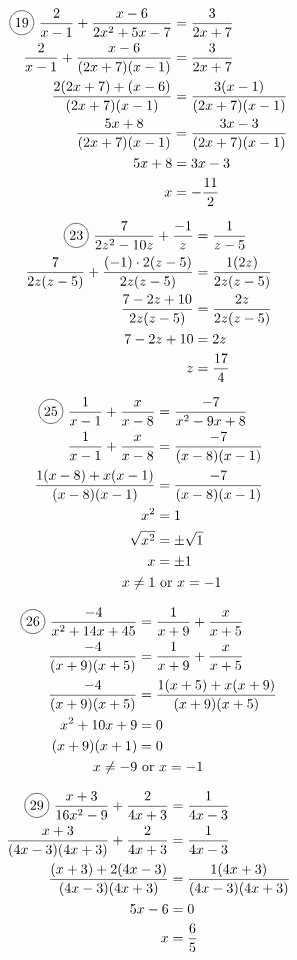 \begin{multicols}{2}
\begin{align*}
  \circled{19}\ \frac{2}{x-1}+\frac{x-6}{2x^{2}+5x-7}&=\frac{3}{2x+7}\\
  \frac{2}{x-1}+\frac{x-6}{(2x+7)(x-1)}&=\frac{3}{2x+7}\\
  \frac{2(2x+7)+(x-6)}{(2x+7)(x-1)}&=\frac{3(x-1)}{(2x+7)(x-1)}\\
  \frac{5x+8}{(2x+7)(x-1)}&=\frac{3x-3}{(2x+7)(x-1)}\\
  5x+8&=3x-3\\
  x&=-\frac{11}{2}
\end{align*}

\begin{align*}
  \circled{23}\ \frac{7}{2z^{2}-10z}+\frac{-1}{z}&=\frac{1}{z-5}\\
  \frac{7}{2z(z-5)}+\frac{(-1)\cdot 2(z-5)}{2z(z-5)}&=\frac{1(2z)}{2z(z-5)}\\
  \frac{7-2z+10}{2z(z-5)}&=\frac{2z}{2z(z-5)}\\
  7-2z+10&=2z\\
  z&=\frac{17}{4}
\end{align*}

\begin{align*}
  \circled{25}\ \frac{1}{x-1}+\frac{x}{x-8}&=\frac{-7}{x^{2}-9x+8}\\
  \frac{1}{x-1}+\frac{x}{x-8}&=\frac{-7}{(x-8)(x-1)}\\
  \frac{1(x-8)+x(x-1)}{(x-8)(x-1)}&=\frac{-7}{(x-8)(x-1)}\\
  x^{2}&=1\\
  \sqrt{x^{2}}&=\pm\sqrt{1}\\
  x&=\pm 1\\
  x\neq 1 &\text{ or } x=-1
\end{align*}

\begin{align*}
  \circled{26}\ \frac{-4}{x^{2}+14x+45}&=\frac{1}{x+9}+\frac{x}{x+5}\\
  \frac{-4}{(x+9)(x+5)}&=\frac{1}{x+9}+\frac{x}{x+5}\\
  \frac{-4}{(x+9)(x+5)}&=\frac{1(x+5)+x(x+9)}{(x+9)(x+5)}\\
  x^{2}+10x+9&=0\\
  (x+9)(x+1)&=0\\
  x\neq-9 &\text{ or } x=-1
\end{align*}

\begin{align*}
  \circled{29}\ \frac{x+3}{16x^{2}-9}+\frac{2}{4x+3}&=\frac{1}{4x-3}\\
  \frac{x+3}{(4x-3)(4x+3)}+\frac{2}{4x+3}&=\frac{1}{4x-3}\\
  \frac{(x+3)+2(4x-3)}{(4x-3)(4x+3)}&=\frac{1(4x+3)}{(4x-3)(4x+3)}\\
  5x-6&=0\\
  x&=\frac{6}{5}
\end{align*}


\end{multicols}
